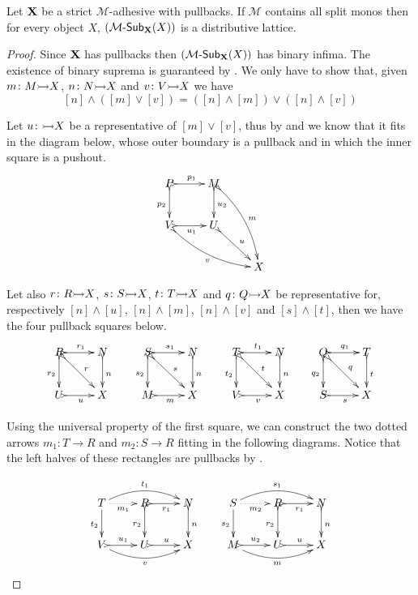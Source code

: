  
 \begin{proposition}\label{prop:distlat}Let $\textbf {\textup{X}}$ be a strict $\mathcal{M}$-adhesive with pullbacks. If $\mathcal{M}$ contains all split monos then for every object $X$, $({\mathcal{M}}\textrm{-}\mathsf{Sub}_{\textbf {\textup{X}}}(X))$ is a distributive lattice. 
 \end{proposition}
\begin{proof}
	Since $\textbf {\textup{X}}$ has pullbacks then $({\mathcal{M}}\textrm{-}\mathsf{Sub}_{\textbf {\textup{X}}}(X))$  has binary infima. The existence of binary suprema is guaranteed by . We only have to show that, given $m\colon M\mto X$, $n\colon N\mto X$ and $v\colon V\mto X$ we have
	\[[n]\wedge ([m]\vee[v])=([n]\wedge [m]) \vee ([n]\wedge [v])\]
	
	Let $u\colon \mto X$ be a representative of $[m]\vee [v]$, thus by  and  we know that it fits in the diagram below, whose outer boundary is a pullback and in which the inner square is a pushout.
		\[\xymatrix{P \ar@{>->}[r]^{p_1} \ar@{>->}[d]_{p_2} & M\ar@{>->}[d]^{u_2} \ar@{>->}@/^.3cm/[ddr]^{m} \\ V \ar@{>->}@/_.3cm/[drr]_{v}\ar@{>->}[r]_{u_1} & U \ar@{>->}[dr]^{u} \\ && X}\]
		
	Let also $r\colon R\mto X$,  $s\colon S\mto X$, $t\colon T\mto X$ and $q\colon Q\mto X$ be  representative for, respectively $[n]\wedge [u]$, $[n]  \wedge [m]$, $[n]\wedge [v]$ and $[s]\wedge [t]$,  then we have the four pullback squares below.
	\[\xymatrix{R \ar@{>->}[r]^{r_1} \ar@{>->}[d]_{r_2}\ar@{>->}[dr]^{r}& N \ar@{>->}[d]^{n} & S \ar@{>->}[r]^{s_1} \ar@{>->}[d]_{s_2}\ar@{>->}[dr]^{s}& N \ar@{>->}[d]^{n}&T \ar@{>->}[r]^{t_1} \ar@{>->}[d]_{t_2}\ar@{>->}[dr]^{t}& N \ar@{>->}[d]^{n}& Q \ar@{>->}[r]^{q_1} \ar@{>->}[d]_{q_2}\ar@{>->}[dr]^{q}& T \ar@{>->}[d]^{t}\\U \ar@{>->}[r]_{u} & X&M \ar@{>->}[r]_{m} & X&V \ar@{>->}[r]_{v} & X&S \ar@{>->}[r]_{s} & X}\]
	
Using the universal property of the first square, we can construct the two dotted arrows $m_1\colon T\to R$ and $m_2\colon S\to R$ fitting in the following diagrams. Notice that the left halves of these rectangles are pullbacks by .

\[\xymatrix{T \ar[d]_{t_2} \ar@/^.4cm/[rr]^{t_1} \ar@{.>}[r]_{m_1}& R \ar@{>->}[r]_{r_1} \ar@{>->}[d]_{r_2}& N \ar@{>->}[d]^{n} & S \ar[d]_{s_2} \ar@/^.4cm/[rr]^{s_1} \ar@{.>}[r]_{m_2}& R \ar@{>->}[r]_{r_1} \ar@{>->}[d]_{r_2}& N \ar@{>->}[d]^{n}\\ V \ar@/_.4cm/[rr]_{v} \ar@{>->}[r]^{u_1}&U \ar@{>->}[r]^{u} & X &  M \ar@/_.4cm/[rr]_{m} \ar@{>->}[r]^{u_2}&U \ar@{>->}[r]^{u} & X}\] 


\end{proof}
